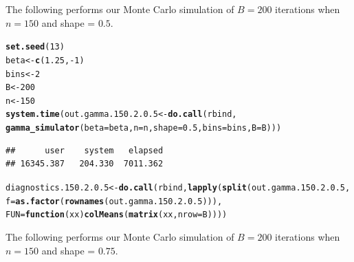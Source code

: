 \documentclass[11pt]{article}\usepackage[]{graphicx}\usepackage[]{color}
\makeatletter
\newcommand{\hlnum}[1]{\textcolor[rgb]{0.686,0.059,0.569}{#1}}%
\newcommand{\hlopt}[1]{\textcolor[rgb]{0,0,0}{#1}}%
\newcommand{\hlstd}[1]{\textcolor[rgb]{0.345,0.345,0.345}{#1}}%
\newcommand{\hlkwa}[1]{\textcolor[rgb]{0.161,0.373,0.58}{\textbf{#1}}}%
\newcommand{\hlkwb}[1]{\textcolor[rgb]{0.69,0.353,0.396}{#1}}%
\newcommand{\hlkwc}[1]{\textcolor[rgb]{0.333,0.667,0.333}{#1}}%
\newcommand{\hlkwd}[1]{\textcolor[rgb]{0.737,0.353,0.396}{\textbf{#1}}}%
\newenvironment{kframe}{%
 \def\at@end@of@kframe{}%
 \ifinner\ifhmode%
  \def\at@end@of@kframe{\end{minipage}}%
  \begin{minipage}{\columnwidth}%
 \fi\fi%
 \def\FrameCommand##1{\hskip\@totalleftmargin \hskip-\fboxsep
 \colorbox{shadecolor}{##1}\hskip-\fboxsep
     \hskip-\linewidth \hskip-\@totalleftmargin \hskip\columnwidth}%
 \MakeFramed {\advance\hsize-\width
   \@totalleftmargin\z@ \linewidth\hsize
   \@setminipage}}%
 {\par\unskip\endMakeFramed%
 \at@end@of@kframe}
\newenvironment{knitrout}{}{} %
\makeatother
\begin{document}
The following performs our Monte Carlo simulation of $B = 200$ iterations 
when $n = 150$ and shape = $0.5$.

\begin{knitrout}
\color{fgcolor}\begin{kframe}
\begin{alltt}
\hlkwd{set.seed}\hlstd{(}\hlnum{13}\hlstd{)}
\hlstd{beta} \hlkwb{<-} \hlkwd{c}\hlstd{(}\hlnum{1.25}\hlstd{,} \hlopt{-}\hlnum{1}\hlstd{)}
\hlstd{bins} \hlkwb{<-} \hlnum{2}
\hlstd{B} \hlkwb{<-} \hlnum{200}
\hlstd{n} \hlkwb{<-} \hlnum{150}
\hlkwd{system.time}\hlstd{(out.gamma.150.2.0.5} \hlkwb{<-} \hlkwd{do.call}\hlstd{(rbind,}
  \hlkwd{gamma_simulator}\hlstd{(}\hlkwc{beta} \hlstd{= beta,} \hlkwc{n} \hlstd{= n,} \hlkwc{shape} \hlstd{=} \hlnum{0.5}\hlstd{,} \hlkwc{bins} \hlstd{= bins,} \hlkwc{B} \hlstd{= B)))}
\end{alltt}
\begin{verbatim}
##      user    system   elapsed 
## 16345.387   204.330  7011.362
\end{verbatim}
\begin{alltt}
\hlstd{diagnostics.150.2.0.5} \hlkwb{<-} \hlkwd{do.call}\hlstd{(rbind,} \hlkwd{lapply}\hlstd{(}\hlkwd{split}\hlstd{(out.gamma.150.2.0.5,}
  \hlkwc{f} \hlstd{=} \hlkwd{as.factor}\hlstd{(}\hlkwd{rownames}\hlstd{(out.gamma.150.2.0.5))),}
  \hlkwc{FUN} \hlstd{=} \hlkwa{function}\hlstd{(}\hlkwc{xx}\hlstd{)} \hlkwd{colMeans}\hlstd{(}\hlkwd{matrix}\hlstd{(xx,} \hlkwc{nrow} \hlstd{= B))))}
\end{alltt}
\end{kframe}
\end{knitrout}




The following performs our Monte Carlo simulation of $B = 200$ iterations 
when $n = 150$ and shape = $0.75$.
\end{document}
